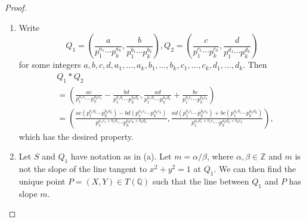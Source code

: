 \documentclass[12pt]{article}
\theoremstyle{definition}
\begin{document}
\begin{proof}\
	\begin{enumerate}[label=(\alph*)]
		\item Write \begin{equation*}
			      Q_1 = \left(\frac{a}{p_1^{a_1}\cdots p_k^{a_k}}, \frac{b}{p_1^{b_1}\cdots p_k^{b_k}}\right), Q_2 = \left(\frac{c}{p_1^{c_1}\cdots p_k^{c_k}}, \frac{d}{p_1^{d_1}\cdots p_k^{d_k}}\right)
		      \end{equation*}
		      for some integers $a, b, c, d, a_1, \dots, a_k, b_1, \dots, b_k, c_1, \dots, c_k, d_1, \dots, d_k$.
		      Then \begin{align*}
			       & Q_1 * Q_2                                                                                                                                                                                                                                                                                                                                          \\
			       & = \left( \frac{ac}{p_1^{a_1c_1} \cdots p_k^{a_kc_k}} - \frac{bd}{p_1^{b_1d_1} \cdots p_k^{b_kd_k}}, \frac{ad}{p_1^{a_1d_1} \cdots p_k^{a_kd_k}} + \frac{bc}{p_1^{b_1c_1} \cdots p_k^{b_kc_k}} \right)                                                                                                                                              \\
			       & = \left( \frac{ac\left(p_1^{b_1d_1} \cdots p_k^{b_kd_k}\right) - bd\left(p_1^{a_1c_1} \cdots p_k^{a_kc_k}\right)}{p_1^{a_1c_1 + b_1d_1} \cdots p_k^{a_kc_k + b_kd_k}}, \frac{ad \left( p_1^{b_1c_1} \cdots p_k^{b_kc_k} \right) + bc \left( p_1^{a_1d_1} \cdots p_k^{a_kd_k} \right)}{p_1^{a_1d_1 + b_1c_1} \cdots p_k^{a_kd_k + b_kc_k}} \right),
		      \end{align*}
		      which has the desired property.
        \item Let $S$ and $Q_1$ have notation as in (a).
          Let $m = \alpha/\beta$, where $\alpha, \beta \in \mathbb{Z}$ and $m$ is not the slope of the line tangent to $x^2 + y^2 = 1$ at $Q_1$.
      We can then find the unique point $P = (X, Y) \in T(\mathbb{Q})$ such that the line between $Q_1$ and $P$ has slope $m$.


\end{enumerate}
\end{proof}
\end{document}
